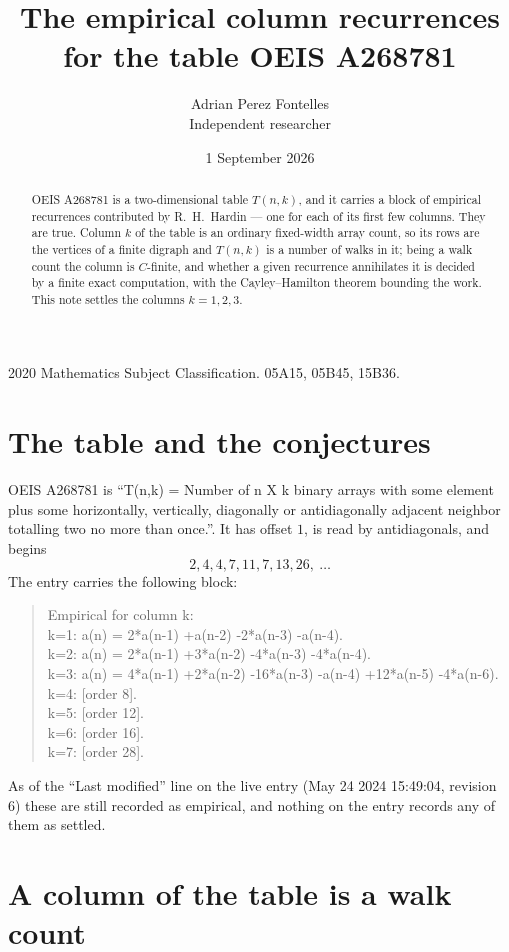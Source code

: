 \documentclass[11pt,a4paper]{article}
\title{The empirical column recurrences for the table OEIS A268781}
\author{Adrian Perez Fontelles\\ \small Independent researcher}
\date{1 September 2026}
\theoremstyle{plain}
\theoremstyle{definition}
\begin{document}
\maketitle

\begin{abstract}
OEIS A268781 is a two-dimensional table $T(n,k)$, and it carries a block of empirical
recurrences contributed by R.~H.~Hardin --- one for each of its first few columns. They are
true. Column $k$ of the table is an ordinary fixed-width array count, so its rows are the
vertices of a finite digraph and $T(n,k)$ is a number of walks in it; being a walk count the
column is $C$-finite, and whether a given recurrence annihilates it is decided by a finite
exact computation, with the Cayley--Hamilton theorem bounding the work. This note settles the columns $k=1, 2, 3$.
\end{abstract}

\noindent\small 2020 Mathematics Subject Classification. 05A15, 05B45, 15B36.\normalsize

\section{The table and the conjectures}

OEIS A268781 is ``T(n,k) = Number of n X k binary arrays with some element plus some horizontally, vertically, diagonally or antidiagonally adjacent neighbor totalling two no more than once.''. It has offset $1$, is
read by antidiagonals, and begins
\[
2, 4, 4, 7, 11, 7, 13, 26,\ \dots
\]
The entry carries the following block:
\begin{quote}\small
Empirical for column k:\\
k=1: a(n) = 2*a(n-1) +a(n-2) -2*a(n-3) -a(n-4).\\
k=2: a(n) = 2*a(n-1) +3*a(n-2) -4*a(n-3) -4*a(n-4).\\
k=3: a(n) = 4*a(n-1) +2*a(n-2) -16*a(n-3) -a(n-4) +12*a(n-5) -4*a(n-6).\\
k=4: [order 8].\\
k=5: [order 12].\\
k=6: [order 16].\\
k=7: [order 28].\\
\end{quote}
As of the ``Last modified'' line on the live entry (May 24 2024 15:49:04, revision 6) these are still
recorded as empirical, and nothing on the entry records any of them as settled.

\section{A column of the table is a walk count}
\end{document}
